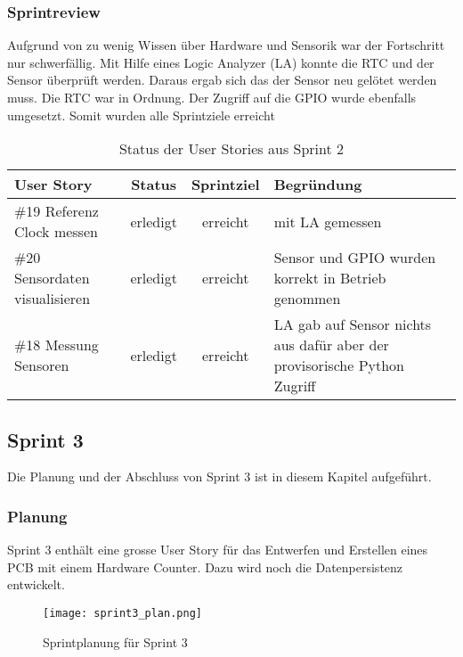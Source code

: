 \subsubsection*{Sprintreview}
Aufgrund von zu wenig Wissen über Hardware und Sensorik war der Fortschritt nur schwerfällig. Mit Hilfe eines Logic Analyzer (LA) konnte die RTC und der Sensor überprüft werden. Daraus ergab sich das der Sensor neu gelötet werden muss. Die RTC war in Ordnung. Der Zugriff auf die GPIO wurde ebenfalls umgesetzt. Somit wurden alle Sprintziele erreicht
\begin{table}[H]
    \centering
    \begin{tabular}{lccp{7cm}}
        \textbf{User Story} &  \textbf{Status} & \textbf{Sprintziel}& \textbf{Begründung}\\\toprule[2pt]
        \#19 Referenz Clock messen & erledigt & erreicht & mit LA gemessen\\
        \#20 Sensordaten visualisieren & erledigt & erreicht & Sensor und GPIO wurden korrekt in Betrieb genommen\\
        \#18 Messung Sensoren & erledigt & erreicht & LA gab auf Sensor nichts aus dafür aber der provisorische Python Zugriff\\
    \end{tabular}
    \caption{Status der User Stories aus Sprint 2}
\end{table}

\clearpage
\subsection*{Sprint 3}
Die Planung und der Abschluss von Sprint 3 ist in diesem Kapitel aufgeführt.
\subsubsection*{Planung}
Sprint 3 enthält eine grosse User Story für das Entwerfen und Erstellen eines PCB mit einem Hardware Counter. Dazu wird noch die Datenpersistenz entwickelt.
\begin{figure}[H]
    \centering
    \texttt{[image: sprint3\_plan.png]}
    \caption{Sprintplanung für Sprint 3}
\end{figure}
